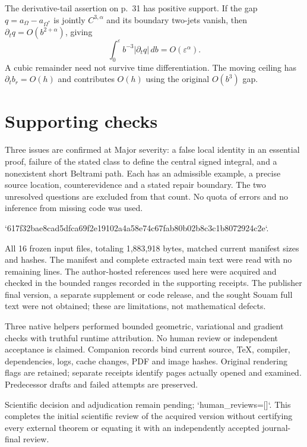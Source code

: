 \documentclass[10pt]{article}
\begin{document}
The derivative-tail assertion on p. 31 has positive support. If the gap \(q=a_\Omega-a_{\Omega^*}\) is jointly \(C^{3,\alpha}\) and its boundary two-jets vanish, then \(\partial_tq=O(b^{2+\alpha})\), giving \[\int_0^\varepsilon b^{-3}|\partial_tq|\,db=O(\varepsilon^\alpha).\] A cubic remainder need not survive time differentiation. The moving ceiling has \(\partial_t b_r=O(h)\) and contributes \(O(h)\) using the original \(O(b^3)\) gap.\par
\section*{Supporting checks}
Three issues are confirmed at Major severity: a false local identity in an essential proof, failure of the stated class to define the central signed integral, and a nonexistent short Beltrami path. Each has an admissible example, a precise source location, counterevidence and a stated repair boundary. The two unresolved questions are excluded from that count. No quota of errors and no inference from missing code was used.\par
`617f32bae8cad5dfca69f2e19102a4a58e74c67fab80b02b8c3c1b8072924c2e`.\par
All 16 frozen input files, totaling 1,883,918 bytes, matched current manifest sizes and hashes. The manifest and complete extracted main text were read with no remaining lines. The author-hosted references used here were acquired and checked in the bounded ranges recorded in the supporting receipts. The publisher final version, a separate supplement or code release, and the sought Souam full text were not obtained; these are limitations, not mathematical defects.\par
Three native helpers performed bounded geometric, variational and gradient checks with truthful runtime attribution. No human review or independent acceptance is claimed. Companion records bind current source, TeX, compiler, dependencies, logs, cache changes, PDF and image hashes. Original rendering flags are retained; separate receipts identify pages actually opened and examined. Predecessor drafts and failed attempts are preserved.\par
Scientific decision and adjudication remain pending; `human\_reviews=[]`. This completes the initial scientific review of the acquired version without certifying every external theorem or equating it with an independently accepted journal-final review.\par
\end{document}
